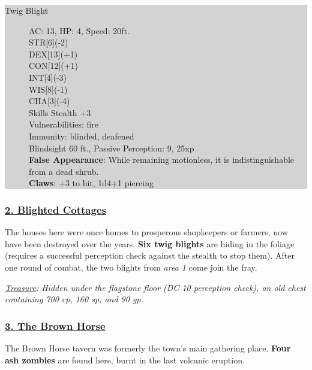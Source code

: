 \colorbox{lightgray}{\begin{minipage}{0.4\textwidth}
		\begin{description}
			\item[Twig Blight]
			AC: 13, HP: 4, Speed: 20ft.
			\\ STR[6](-2) 
			\\ DEX[13](+1)
			\\ CON[12](+1)
			\\ INT[4](-3)
			\\ WIS[8](-1)
			\\ CHA[3](-4)
			\\ Skills Stealth +3
			\\ Vulnerabilities: fire 
			\\ Immunity: blinded, deafened
			\\ Blindsight 60 ft., Passive Perception: 9, 25xp
			\\ \textbf{False Appearance}: While remaining motionless, it is indistinguishable from a dead shrub.
			\\ \textbf{Claws}: +3 to hit, 1d4+1 piercing
		\end{description}
\end{minipage}}
\break

\subsubsection*{\underline{2. Blighted Cottages}}
The houses here were once homes to prosperous shopkeepers or farmers, now have been destroyed over the years. \textbf{Six twig blights} are hiding in the foliage (requires a successful perception check against the stealth to stop them). After one round of combat, the two blights from \emph{area 1} come join the fray.

\emph{\underline{Treasure}: Hidden under the flagstone floor (DC 10 perception check), an old chest containing 700 cp, 160 sp, and 90 gp.} 

\subsubsection*{\underline{3. The Brown Horse}}
The Brown Horse tavern was formerly the town's main gathering place. \textbf{Four ash zombies} are found here, burnt in the last volcanic eruption.

